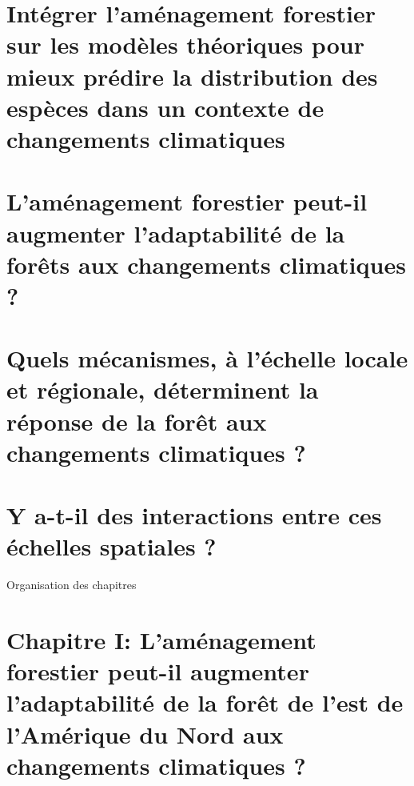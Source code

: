 \documentclass[11pt, compress, aspectratio=1610]{beamer}
\begin{document}
\section{Intégrer l'aménagement forestier sur les modèles théoriques
pour mieux prédire la distribution des espèces dans un contexte de
changements
climatiques}\label{intuxe9grer-lamuxe9nagement-forestier-sur-les-moduxe8les-thuxe9oriques-pour-mieux-pruxe9dire-la-distribution-des-espuxe8ces-dans-un-contexte-de-changements-climatiques}

\section{\texorpdfstring{L'aménagement forestier peut-il
\newline augmenter l'adaptabilité de la forêts aux changements
climatiques
?}{L'aménagement forestier peut-il augmenter l'adaptabilité de la forêts aux changements climatiques ?}}\label{lamuxe9nagement-forestier-peut-il-augmenter-ladaptabilituxe9-de-la-foruxeats-aux-changements-climatiques}

\section{\texorpdfstring{Quels mécanismes, à l'échelle locale et
régionale, déterminent la réponse de la forêt aux changements
\newline climatiques
?}{Quels mécanismes, à l'échelle locale et régionale, déterminent la réponse de la forêt aux changements climatiques ?}}\label{quels-muxe9canismes-uxe0-luxe9chelle-locale-et-ruxe9gionale-duxe9terminent-la-ruxe9ponse-de-la-foruxeat-aux-changements-climatiques}

\section{Y a-t-il des interactions entre ces échelles spatiales
?}\label{y-a-t-il-des-interactions-entre-ces-uxe9chelles-spatiales}

\begin{frame}{Organisation des chapitres}



\end{frame}

\section{\texorpdfstring{Chapitre I: \newline L'aménagement forestier
peut-il \newline augmenter l'adaptabilité de la forêt de l'est de
l'Amérique du Nord aux changements climatiques
?}{Chapitre I: L'aménagement forestier peut-il augmenter l'adaptabilité de la forêt de l'est de l'Amérique du Nord aux changements climatiques ?}}\label{chapitre-i-lamuxe9nagement-forestier-peut-il-augmenter-ladaptabilituxe9-de-la-foruxeat-de-lest-de-lamuxe9rique-du-nord-aux-changements-climatiques}
\end{document}

